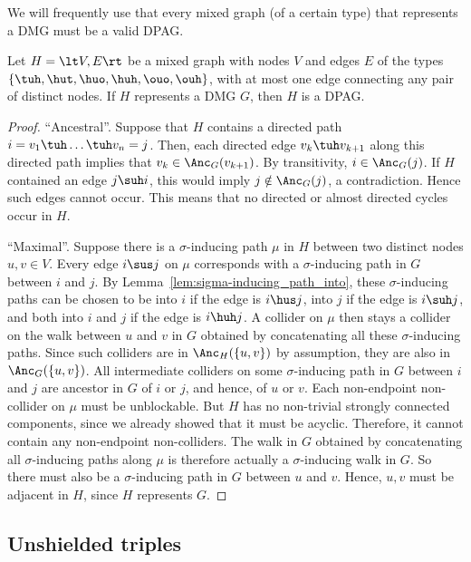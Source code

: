 We will frequently use that every mixed graph (of a certain type) that represents a DMG must be a valid DPAG.
\begin{Prp}\label{prp:dpag_represents_dmg_is_valid}
Let $H = \lt V,E\rt$ be a mixed graph with nodes $V$ and edges $E$ of the types $\{\tuh,\hut,\huo,\huh,\ouo,\ouh\}$, with at most one edge connecting any pair of distinct nodes.
If $H$ represents a DMG $G$, then $H$ is a DPAG.
\end{Prp}
\begin{proof}
  ``Ancestral''. Suppose that $H$ contains a directed path $i = v_1 \tuh \dots \tuh v_n = j$.
  Then, each directed edge $v_k \tuh v_{k+1}$ along this directed path implies that $v_k \in \Anc_G(v_{k+1})$. 
  By transitivity, $i \in \Anc_G(j)$. 
  If $H$ contained an edge $j \suh i$, this would imply $j \notin \Anc_G(j)$, a contradiction. 
  Hence such edges cannot occur.
  This means that no directed or almost directed cycles occur in $H$.

  ``Maximal''.
  Suppose there is a $\sigma$-inducing path $\mu$ in $H$ between two distinct nodes $u,v \in V$. 
  Every edge $i \sus j$ on $\mu$ corresponds with a $\sigma$-inducing path in $G$ between $i$ and $j$.
  By Lemma~\ref{lem:sigma-inducing_path_into}, these $\sigma$-inducing paths can be chosen to be into $i$ if the edge is $i \hus j$, into $j$ if the edge is $i \suh j$, and both into $i$ and $j$ if the edge is $i \huh j$. 
  A collider on $\mu$ then stays a collider on the walk between $u$ and $v$ in $G$ obtained by concatenating all these $\sigma$-inducing paths.
  Since such colliders are in $\Anc_H(\{u,v\})$ by assumption, they are also in $\Anc_G(\{u,v\})$.
  All intermediate colliders on some $\sigma$-inducing path in $G$ between $i$ and $j$ are ancestor in $G$ of $i$ or $j$, and
  hence, of $u$ or $v$.
  Each non-endpoint non-collider on $\mu$ must be unblockable.
  But $H$ has no non-trivial strongly connected components, since we already showed that it must be acyclic.
  Therefore, it cannot contain any non-endpoint non-colliders.
  The walk in $G$ obtained by concatenating all $\sigma$-inducing paths along $\mu$ is therefore actually a $\sigma$-inducing walk in $G$.
  So there must also be a $\sigma$-inducing path in $G$ between $u$ and $v$.
  Hence, $u,v$ must be adjacent in $H$, since $H$ represents $G$.
\end{proof}

\subsection{Unshielded triples}

